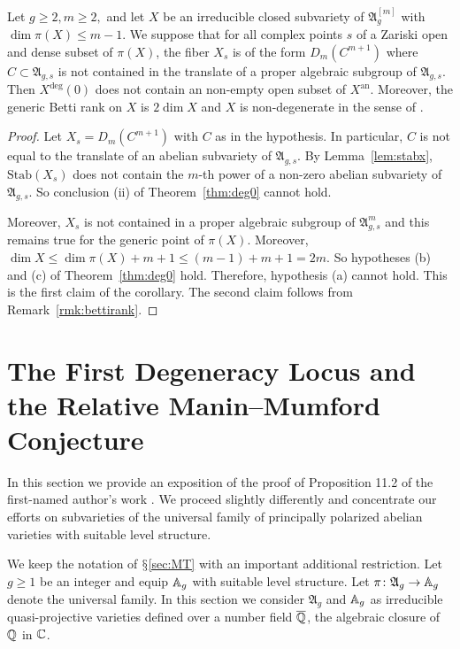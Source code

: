 \documentclass[12pt,oneside]{amsart}
\begin{document}
\begin{corollary}
  \label{cor:fiberpowercurve}
  Let $g\ge 2, m\ge 2,$  and 
  let $X$ be an irreducible closed subvariety of
  $\mathfrak{A}_g^{[m]}$ with $\dim\pi(X) \le m-1$.
  We suppose that for all complex points $s$ of a Zariski open and
  dense subset of $\pi(X)$, the fiber $X_s$
  is of the form $D_{m}(C^{m+1})$ where $C\subset \mathfrak{A}_{g,s}$
  is not contained in the translate of a  proper algebraic subgroup of $\mathfrak{A}_{g,s}$.
  Then $X^{\mathrm{deg}}(0)$ does not contain an non-empty  open
  subset of $X^{\mathrm{an}}$. Moreover, the generic Betti rank on $X$
  is  $2\dim X$ and $X$ is non-degenerate in the sense of \cite[Definition~1.5]{DGHUnifML}.   
\end{corollary}
\begin{proof}
  Let $X_s = D_m(C^{m+1})$ with $C$ as in the hypothesis.
  In particular, $C$ is not equal to the translate of an abelian
  subvariety of $\mathfrak{A}_{g,s}$.
  By Lemma~\ref{lem:stabx}, $\mathrm{Stab}(X_s)$ does not contain the
  $m$-th power of a non-zero abelian subvariety of
  $\mathfrak{A}_{g,s}$. So conclusion (ii) of Theorem~\ref{thm:deg0} cannot
  hold.
  
  Moreover, $X_s$ is not contained in a proper algebraic subgroup of
  $\mathfrak{A}_{g,s}^m$ and this remains true for the generic point
  of $\pi(X)$. Moreover, $\dim X \le \dim\pi(X) + m+1\le
  (m-1)+m+1=2m$.
  So hypotheses (b) and (c) of Theorem~\ref{thm:deg0} hold.
  Therefore, hypothesis (a) cannot hold. This is the first claim of
  the corollary. The second claim follows from Remark~\ref{rmk:bettirank}. 
\end{proof}

\section{The First Degeneracy Locus and the Relative Manin--Mumford Conjecture}
\label{sec:relmm}

In this section we provide an exposition of the proof of
Proposition 11.2 of the first-named author's work \cite{GaoBettiRank}.
We proceed slightly differently and  concentrate our efforts
on subvarieties of the universal family of principally polarized
abelian varieties with suitable level structure.

We keep the notation of $\mathsection$\ref{sec:MT} with an important
additional restriction. Let $g\ge 1$ be an integer and equip ${\mathbb{A}}_g$
with suitable level structure. Let $\pi\colon
\mathfrak{A}_g\rightarrow{\mathbb{A}}_g$ denote the universal family. In this
section we consider $\mathfrak{A}_g$ and ${\mathbb{A}}_g$ as irreducible
quasi-projective varieties defined over a number field ${\overline{\mathbb{Q}}}$, the
algebraic closure of ${\mathbb{Q}}$ in ${\mathbb{C}}$.
\end{document}

